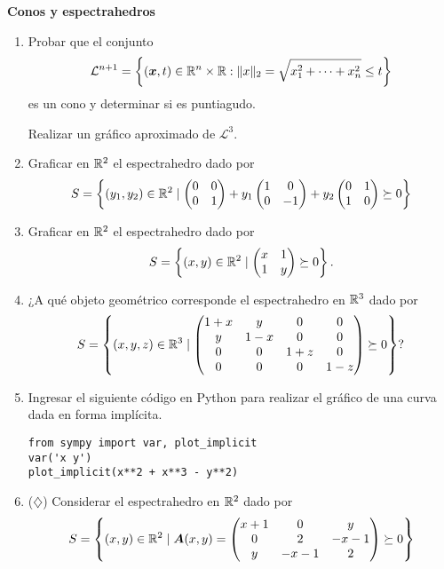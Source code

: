 \documentclass[11pt]{article}
\begin{document}
\noindent \textbf{Conos y espectrahedros}
\begin{enumerate}[resume]
\item Probar que el conjunto
$$
\mathcal{L}^{n+1} = \left\{ (\bm{x}, t) \in \mathbb{R}^{n} \times \mathbb{R} : \|x\|_2 =\sqrt{x_1^2 + \dots + x_n^2} \le t \right\}
$$
es un cono y determinar si es puntiagudo.

Realizar un gráfico aproximado de $\mathcal{L}^{3}$.

\item Graficar en $\mathbb{R}^2$ el espectrahedro dado por
$$S =
\left\{
(y_1, y_2) \in \mathbb{R}^2 \mid
\begin{pmatrix}
0 & 0 \\
0 & 1
\end{pmatrix}
+
y_1 \begin{pmatrix}
1 & 0 \\
0 & -1
\end{pmatrix}
+
y_2 \begin{pmatrix}
0 & 1 \\
1 & 0
\end{pmatrix}
\succeq 0 \right\}
$$

\item Graficar en $\mathbb{R}^2$ el espectrahedro dado por
$$S =
\left\{
(x, y) \in \mathbb{R}^2 \mid
\begin{pmatrix}
 x & 1 \\ 1 & y
\end{pmatrix} \succeq 0\right\}.
$$

\item ¿A qué objeto geométrico corresponde el espectrahedro en $\mathbb{R}^3$ dado por
$$S =
\left\{
(x, y, z) \in \mathbb{R}^3 \mid
\begin{pmatrix}
 1 + x & y & 0 & 0  \\
 y & 1-x & 0 & 0 \\
 0 & 0 & 1+z & 0 \\
 0 & 0 & 0 & 1-z
\end{pmatrix} \succeq 0\right\}?
$$

\item Ingresar el siguiente código en Python para realizar el gráfico de una curva dada en forma implícita.
\begin{lstlisting}
from sympy import var, plot_implicit
var('x y')
plot_implicit(x**2 + x**3 - y**2)
\end{lstlisting}

\item ($\diamondsuit$) Considerar el espectrahedro en $\mathbb{R}^2$ dado por
$$S =
\left\{
(x,y) \in \mathbb{R}^2 \mid \bm{A}(x,y) = \begin{pmatrix}
x+1 & 0 & y \\
0 & 2 & -x-1 \\
y & -x-1 & 2
\end{pmatrix}\succeq 0
\right\}
$$


\end{enumerate}
\end{document}
